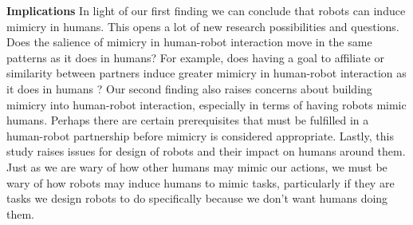 \documentclass{acm_proc_article-sp}
\begin{document}
\textbf{Implications}
In light of our first finding we can conclude that robots can induce mimicry in humans. This opens a lot of new research possibilities and questions. Does the salience of mimicry in human-robot interaction move in the same patterns as it does in humans? For example, does having a goal to affiliate or similarity between partners induce greater mimicry in human-robot interaction as it does in humans \cite{chartrand2013antecedents}? Our second finding also raises concerns about building mimicry into human-robot interaction, especially in terms of having robots mimic humans. Perhaps there are certain prerequisites that must be fulfilled in a human-robot partnership before mimicry is considered appropriate. Lastly, this study raises issues for design of robots and their impact on humans around them. Just as we are wary of how other humans may mimic our actions, we must be wary of how robots may induce humans to mimic tasks, particularly if they are tasks we design robots to do specifically because we don't want humans doing them.


%

%
\end{document}
